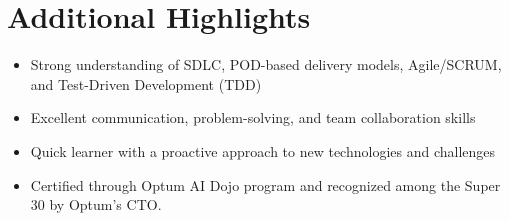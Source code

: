 \documentclass[a4paper,8pt]{article}
\begin{document}
\section{Additional Highlights}
\vspace{0.2cm}
\begin{itemize}[nosep, leftmargin=1.2em, itemsep=2pt]
    \item Strong understanding of SDLC, POD-based delivery models, Agile/SCRUM, and Test-Driven Development (TDD)
    \item Excellent communication, problem-solving, and team collaboration skills
    \item Quick learner with a proactive approach to new technologies and challenges
    \item Certified through Optum AI Dojo program and recognized among the Super 30 by Optum's CTO.
\end{itemize}
\end{document}
